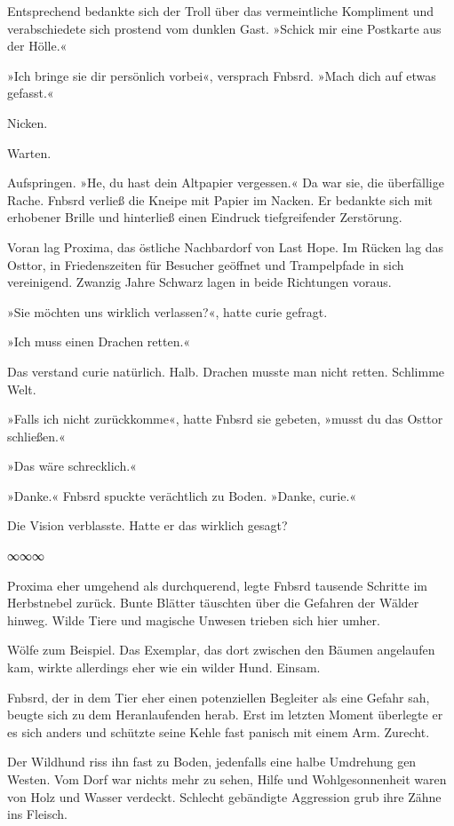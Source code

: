 Entsprechend bedankte sich der Troll über das vermeintliche Kompliment und verabschiedete sich prostend vom dunklen Gast. »Schick mir eine Postkarte aus der Hölle.«

»Ich bringe sie dir persönlich vorbei«, versprach Fnbsrd. »Mach dich auf etwas gefasst.«

Nicken.

Warten.

Aufspringen. »He, du hast dein Altpapier vergessen.« Da war sie, die überfällige Rache. Fnbsrd verließ die Kneipe mit Papier im Nacken. Er bedankte sich mit erhobener Brille und hinterließ einen Eindruck tiefgreifender Zerstörung.

Voran lag Proxima, das östliche Nachbardorf von Last Hope. Im Rücken lag das Osttor, in Friedenszeiten für Besucher geöffnet und Trampelpfade in sich vereinigend. Zwanzig Jahre Schwarz lagen in beide Richtungen voraus.

»Sie möchten uns wirklich verlassen?«, hatte curie gefragt.

»Ich muss einen Drachen retten.«

Das verstand curie natürlich. Halb. Drachen musste man nicht retten. Schlimme Welt.

»Falls ich nicht zurückkomme«, hatte Fnbsrd sie gebeten, »musst du das Osttor schließen.«

»Das wäre schrecklich.«

»Danke.« Fnbsrd spuckte verächtlich zu Boden. »Danke, curie.«

Die Vision verblasste. Hatte er das wirklich gesagt?

\begin{center}
∞∞∞
\end{center}

Proxima eher umgehend als durchquerend, legte Fnbsrd tausende Schritte im Herbstnebel zurück. Bunte Blätter täuschten über die Gefahren der Wälder hinweg. Wilde Tiere und magische Unwesen trieben sich hier umher.

Wölfe zum Beispiel. Das Exemplar, das dort zwischen den Bäumen angelaufen kam, wirkte allerdings eher wie ein wilder Hund. Einsam.

Fnbsrd, der in dem Tier eher einen potenziellen Begleiter als eine Gefahr sah, beugte sich zu dem Heranlaufenden herab. Erst im letzten Moment überlegte er es sich anders und schützte seine Kehle fast panisch mit einem Arm. Zurecht.

Der Wildhund riss ihn fast zu Boden, jedenfalls eine halbe Umdrehung gen Westen. Vom Dorf war nichts mehr zu sehen, Hilfe und Wohlgesonnenheit waren von Holz und Wasser verdeckt. Schlecht gebändigte Aggression grub ihre Zähne ins Fleisch.

